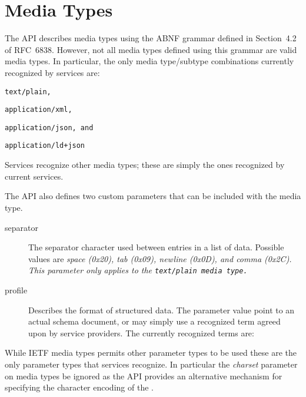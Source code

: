 
\section{Media Types}\label{sec:media}

The \lapps API describes media types using the ABNF grammar  defined in Section~4.2 of RFC~6838\cite{rfc6838}. However, not all media types defined using this grammar are valid \lapps media types.  In particular, the only media type/subtype combinations currently recognized by \lapps services are:
\begin{listing}
\item \tt{text/plain},
\item \tt{application/xml},
\item \tt{application/json}, and
\item \tt{application/ld+json}
\end{listing}

Services \may recognize other media types; these are simply the ones recognized by current \lapps services.

The \lapps API also defines two custom parameters that can be included with the media type.

\begin{description}
\item[separator] The separator character used between entries in a list of data. Possible values are \it{space} (0x20), \it{tab} (0x09), \it{newline} (0x0D), and \it{comma} (0x2C). This parameter only applies to the \tt{text/plain} media type.
\item[profile] Describes the format of structured data.  The parameter value \may point to an actual schema document, or may simply use a recognized term agreed upon by service providers.  The currently recognized terms are:
\end{description}

While IETF media types permits other parameter types to be used these are the only parameter types that \lapps services \must recognize.  In particular the \emph{charset} parameter on media types \must be ignored as the \lapps API provides an alternative mechanism for specifying the character encoding of the \payload.

